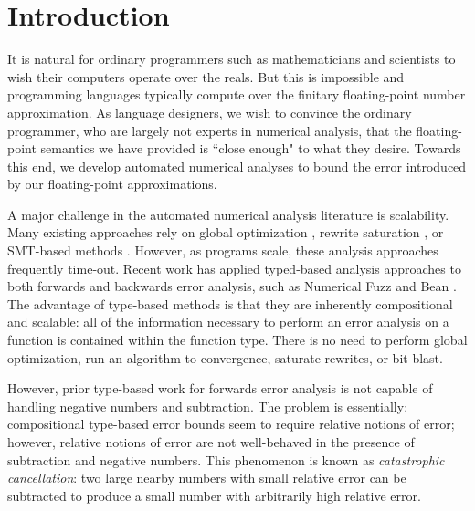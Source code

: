 \section{Introduction}
It is natural for ordinary programmers such as mathematicians and scientists to
wish their computers operate over the reals. 
But this is impossible and programming languages typically compute over the
finitary floating-point number approximation.
As language designers, we wish to convince the ordinary programmer, who are
largely not experts in numerical analysis, that the floating-point semantics we
have provided is ``close enough" to what they desire.
Towards this end, we develop automated numerical analyses to bound the error
introduced by our floating-point approximations.

A major challenge in the automated numerical analysis literature is scalability.
Many existing approaches rely on global optimization \cite{fptaylor}
\cite{satire}, rewrite saturation \cite{gappa}, or SMT-based methods
\cite{rosa}. However, as programs scale, these analysis approaches frequently
time-out. Recent work has applied typed-based analysis approaches to both
forwards and backwards error analysis, such as Numerical Fuzz \cite{numfuzz} and
Bean \cite{bean}. The advantage of type-based methods is that they are
inherently compositional and scalable: all of the information necessary to
perform an error analysis on a function is contained within the function type.
There is no need to perform global optimization, run an algorithm to
convergence, saturate rewrites, or bit-blast.

However, prior type-based work for forwards error analysis is not capable of
handling negative numbers and subtraction. The problem is essentially:
compositional type-based error bounds seem to require relative notions of error;
however, relative notions of error are not well-behaved in the presence of
subtraction and negative numbers. This phenomenon is known as
\textit{catastrophic cancellation}: two large nearby numbers with small relative
error can be subtracted to produce a small number with arbitrarily high relative
error.

